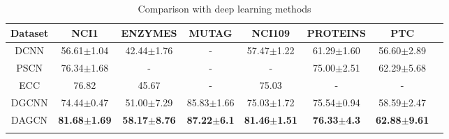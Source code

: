 \documentclass[conference]{IEEEtran}
\begin{document}
	\begin{table*}[t]
        \centering
        \caption{Comparison with deep learning methods}
        \begin{tabular}{cccccccc}
\hline
Dataset              & NCI1                             & ENZYMES                 & MUTAG                   & NCI109                  & PROTEINS                & PTC     \\
\hline
DCNN                 & 56.61$\pm$1.04                  & 42.44$\pm$1.76          & -                       & 57.47$\pm$1.22          & 61.29$\pm$1.60          & 56.60$\pm$2.89 \\
PSCN                 & 76.34$\pm$1.68                       & -                       & -                       & -                       & 75.00$\pm$2.51          & 62.29$\pm$5.68 \\
ECC                  & 76.82                                   & 45.67                   & -                       & 75.03                   & -                       & -              \\
DGCNN                & 74.44$\pm$0.47            & 51.00$\pm$7.29          & 85.83$\pm$1.66          & 75.03$\pm$1.72          & 75.54$\pm$0.94          & 58.59$\pm$2.47 \\
DAGCN               & \textbf{81.68$\pm$1.69}       & \textbf{58.17$\pm$8.76} & \textbf{87.22$\pm$6.1}  & \textbf{81.46$\pm$1.51} & \textbf{76.33$\pm$4.3}  & \textbf{62.88$\pm$9.61} \\ 
\hline
\multicolumn{1}{l}{} & \multicolumn{1}{l}{} & \multicolumn{1}{l}{} & \multicolumn{1}{l}{} & \multicolumn{1}{l}{} & \multicolumn{1}{l}{} & \multicolumn{1}{l}{} &               
        \end{tabular}
    \label{tb:result1}
    \end{table*}
\end{document}
